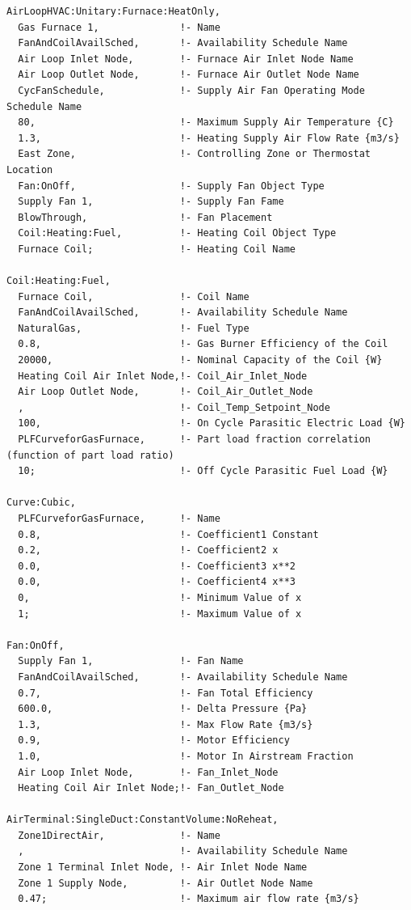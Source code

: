 \begin{lstlisting}
AirLoopHVAC:Unitary:Furnace:HeatOnly,
  Gas Furnace 1,              !- Name
  FanAndCoilAvailSched,       !- Availability Schedule Name
  Air Loop Inlet Node,        !- Furnace Air Inlet Node Name
  Air Loop Outlet Node,       !- Furnace Air Outlet Node Name
  CycFanSchedule,             !- Supply Air Fan Operating Mode Schedule Name
  80,                         !- Maximum Supply Air Temperature {C}
  1.3,                        !- Heating Supply Air Flow Rate {m3/s}
  East Zone,                  !- Controlling Zone or Thermostat Location
  Fan:OnOff,                  !- Supply Fan Object Type
  Supply Fan 1,               !- Supply Fan Fame
  BlowThrough,                !- Fan Placement
  Coil:Heating:Fuel,          !- Heating Coil Object Type
  Furnace Coil;               !- Heating Coil Name

Coil:Heating:Fuel,
  Furnace Coil,               !- Coil Name
  FanAndCoilAvailSched,       !- Availability Schedule Name
  NaturalGas,                 !- Fuel Type
  0.8,                        !- Gas Burner Efficiency of the Coil
  20000,                      !- Nominal Capacity of the Coil {W}
  Heating Coil Air Inlet Node,!- Coil_Air_Inlet_Node
  Air Loop Outlet Node,       !- Coil_Air_Outlet_Node
  ,                           !- Coil_Temp_Setpoint_Node
  100,                        !- On Cycle Parasitic Electric Load {W}
  PLFCurveforGasFurnace,      !- Part load fraction correlation (function of part load ratio)
  10;                         !- Off Cycle Parasitic Fuel Load {W}

Curve:Cubic,
  PLFCurveforGasFurnace,      !- Name
  0.8,                        !- Coefficient1 Constant
  0.2,                        !- Coefficient2 x
  0.0,                        !- Coefficient3 x**2
  0.0,                        !- Coefficient4 x**3
  0,                          !- Minimum Value of x
  1;                          !- Maximum Value of x

Fan:OnOff,
  Supply Fan 1,               !- Fan Name
  FanAndCoilAvailSched,       !- Availability Schedule Name
  0.7,                        !- Fan Total Efficiency
  600.0,                      !- Delta Pressure {Pa}
  1.3,                        !- Max Flow Rate {m3/s}
  0.9,                        !- Motor Efficiency
  1.0,                        !- Motor In Airstream Fraction
  Air Loop Inlet Node,        !- Fan_Inlet_Node
  Heating Coil Air Inlet Node;!- Fan_Outlet_Node

AirTerminal:SingleDuct:ConstantVolume:NoReheat,
  Zone1DirectAir,             !- Name
  ,                           !- Availability Schedule Name
  Zone 1 Terminal Inlet Node, !- Air Inlet Node Name
  Zone 1 Supply Node,         !- Air Outlet Node Name
  0.47;                       !- Maximum air flow rate {m3/s}


\end{lstlisting}
